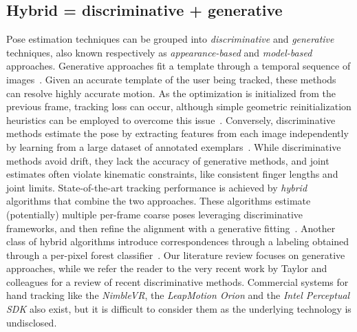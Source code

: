 \subsection*{Hybrid = discriminative + generative}
% 
Pose estimation techniques can be grouped into \emph{discriminative} and \emph{generative} techniques, also known respectively as \emph{appearance-based} and \emph{model-based} approaches.
Generative approaches fit a template through a temporal sequence of images~\cite{oiko2011hand,melax2013dynamics,schroder2014real,tagliasacchi2015robust}. Given an accurate template of the user being tracked, these methods can resolve highly accurate motion. As the optimization is initialized from the previous frame, tracking loss can occur, although simple geometric reinitialization heuristics can be employed to overcome this issue~\cite{melax2013dynamics,qian2014realtime}. 
Conversely, discriminative methods estimate the pose by extracting features from each image independently by learning from a large dataset of annotated exemplars~\cite{keskin2012hand,tang2013real,tejani2014latent,sun2015cascaded}.
While discriminative methods avoid drift, they lack the accuracy of generative methods, and joint estimates often violate kinematic constraints, like consistent finger lengths and joint limits.
State-of-the-art tracking performance is achieved by \emph{hybrid} algorithms that combine the two approaches. These algorithms estimate (potentially) multiple per-frame coarse poses leveraging discriminative frameworks, and then refine the alignment with a generative fitting~\cite{tompson2014real,qian2014realtime,sharp2015accurate}.
Another class of hybrid algorithms introduce correspondences through a labeling obtained through a per-pixel forest  classifier~\cite{sridhar2015fast,fleishman2015icpik}.
% 
Our literature review focuses on generative approaches, while we refer the reader to the very recent work by Taylor and colleagues \cite{taylor2016joint} for a review of recent discriminative methods. Commercial systems for hand tracking like the \emph{NimbleVR}, the \emph{LeapMotion Orion} and the \emph{Intel Perceptual SDK} also exist, but it is difficult to consider them as the underlying technology is undisclosed.

